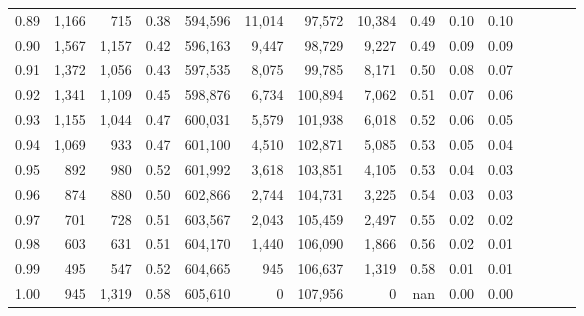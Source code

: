 \begin{tabular}{rrrcrrrrrrrrrrr}
0.89 &   1,166 &    715 &                                       0.38 &  594,596 &   11,014 &   97,572 &   10,384 &  0.49 &  0.10 &                         0.10 \\
0.90 &   1,567 &  1,157 &                                       0.42 &  596,163 &    9,447 &   98,729 &    9,227 &  0.49 &  0.09 &                         0.09 \\
0.91 &   1,372 &  1,056 &                                       0.43 &  597,535 &    8,075 &   99,785 &    8,171 &  0.50 &  0.08 &                         0.07 \\
0.92 &   1,341 &  1,109 &                                       0.45 &  598,876 &    6,734 &  100,894 &    7,062 &  0.51 &  0.07 &                         0.06 \\
0.93 &   1,155 &  1,044 &                                       0.47 &  600,031 &    5,579 &  101,938 &    6,018 &  0.52 &  0.06 &                         0.05 \\
0.94 &   1,069 &    933 &                                       0.47 &  601,100 &    4,510 &  102,871 &    5,085 &  0.53 &  0.05 &                         0.04 \\
0.95 &     892 &    980 &                                       0.52 &  601,992 &    3,618 &  103,851 &    4,105 &  0.53 &  0.04 &                         0.03 \\
0.96 &     874 &    880 &                                       0.50 &  602,866 &    2,744 &  104,731 &    3,225 &  0.54 &  0.03 &                         0.03 \\
0.97 &     701 &    728 &                                       0.51 &  603,567 &    2,043 &  105,459 &    2,497 &  0.55 &  0.02 &                         0.02 \\
0.98 &     603 &    631 &                                       0.51 &  604,170 &    1,440 &  106,090 &    1,866 &  0.56 &  0.02 &                         0.01 \\
0.99 &     495 &    547 &                                       0.52 &  604,665 &      945 &  106,637 &    1,319 &  0.58 &  0.01 &                         0.01 \\
1.00 &     945 &  1,319 &                                       0.58 &  605,610 &        0 &  107,956 &        0 &   nan &  0.00 &                         0.00 \\
\bottomrule
\end{tabular}
